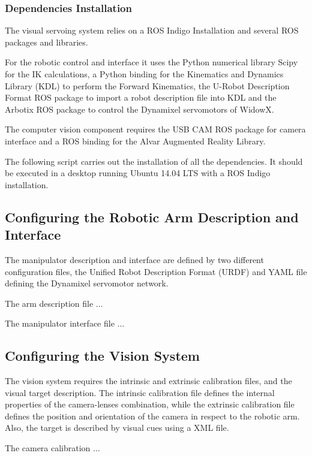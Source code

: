 \documentclass[11pt]{article}
\begin{document}
    \subsubsection{Dependencies Installation}
        The visual servoing system relies on a ROS Indigo Installation and several ROS packages and libraries. 
        
        For the robotic control and interface it uses the Python numerical library Scipy for the IK calculations, a Python binding for the Kinematics and Dynamics Library (KDL) to perform the Forward Kinematics, the U-Robot Description Format ROS package to import a robot description file into KDL and the Arbotix ROS package to control the Dynamixel servomotors of WidowX.
        
        The computer vision component requires the USB CAM ROS package for camera interface and a ROS binding for the Alvar Augmented Reality Library.
        
        \noindent The following script carries out the installation of all the dependencies. It should be executed in a desktop running Ubuntu 14.04 LTS with a ROS Indigo installation.
        

    \subsection{Configuring the Robotic Arm Description and Interface}
        The manipulator description and interface are defined by two different configuration files, the Unified Robot Description Format (URDF) and YAML file defining the Dynamixel servomotor network.
        
        The arm description file ...
        
        The manipulator interface file ...
    
    \subsection{Configuring the Vision System}
        The vision system requires the intrinsic and extrinsic calibration files, and the visual target description. The intrinsic calibration file defines the internal properties of the camera-lenses combination, while the extrinsic calibration file defines the position and orientation of the camera in respect to the robotic arm. Also, the target is described by visual cues using a XML file.
        
        The camera calibration ... %
        
\end{document}

